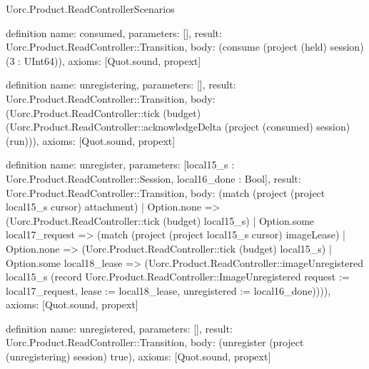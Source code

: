 \begin{lexlean}{Uorc.Product.ReadControllerScenarios}
\begin{semanticmodule}
definition{
  name: consumed,
  parameters: [],
  result: Uorc.Product.ReadController::Transition,
  body: (consume (project (held) session) (3 : UInt64)),
  axioms: [Quot.sound, propext]
}

definition{
  name: unregistering,
  parameters: [],
  result: Uorc.Product.ReadController::Transition,
  body: (Uorc.Product.ReadController::tick (budget) (Uorc.Product.ReadController::acknowledgeDelta (project (consumed) session) (run))),
  axioms: [Quot.sound, propext]
}

definition{
  name: unregister,
  parameters: [local15_s : Uorc.Product.ReadController::Session, local16_done : Bool],
  result: Uorc.Product.ReadController::Transition,
  body: (match (project (project local15_s cursor) attachment)
    | Option.none => (Uorc.Product.ReadController::tick (budget) local15_s)
    | Option.some local17_request => (match (project (project local15_s cursor) imageLease)
      | Option.none => (Uorc.Product.ReadController::tick (budget) local15_s)
      | Option.some local18_lease => (Uorc.Product.ReadController::imageUnregistered local15_s (record Uorc.Product.ReadController::ImageUnregistered {request := local17_request, lease := local18_lease, unregistered := local16_done})))),
  axioms: [Quot.sound, propext]
}

definition{
  name: unregistered,
  parameters: [],
  result: Uorc.Product.ReadController::Transition,
  body: (unregister (project (unregistering) session) true),
  axioms: [Quot.sound, propext]
}


\end{semanticmodule}
\end{lexlean}
